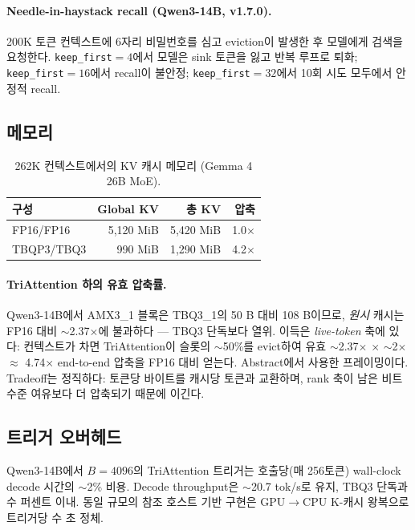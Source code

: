 \documentclass[10pt,twocolumn]{article}
\begin{document}
\paragraph{Needle-in-haystack recall (Qwen3-14B, v1.7.0).}
200K 토큰 컨텍스트에 6자리 비밀번호를 심고 eviction이 발생한 후 모델에게 검색을 요청한다. \texttt{keep\_first}$=4$에서 모델은 sink 토큰을 잃고 반복 루프로 퇴화; \texttt{keep\_first}$=16$에서 recall이 불안정; \texttt{keep\_first}$=32$에서 10회 시도 모두에서 안정적 recall.

\subsection{메모리}

\begin{table}[h]
\centering
\small
\begin{tabular}{@{}lrrr@{}}
\toprule
구성 & Global KV & 총 KV & 압축 \\
\midrule
FP16/FP16 & 5,120 MiB & 5,420 MiB & 1.0$\times$ \\
TBQP3/TBQ3 & 990 MiB & 1,290 MiB & 4.2$\times$ \\
\bottomrule
\end{tabular}
\caption{262K 컨텍스트에서의 KV 캐시 메모리 (Gemma 4 26B MoE).}
\label{tab:memory}
\end{table}

\paragraph{TriAttention 하의 유효 압축률.}
Qwen3-14B에서 AMX3\_1 블록은 TBQ3\_1의 50 B 대비 108 B이므로, \emph{원시} 캐시는 FP16 대비 $\sim$2.37$\times$에 불과하다 --- TBQ3 단독보다 열위. 이득은 \emph{live-token} 축에 있다: 컨텍스트가 차면 TriAttention이 슬롯의 $\sim$50\%를 evict하여 유효 $\sim$2.37$\times$ $\times$ $\sim$2$\times$ $\approx$ 4.74$\times$ end-to-end 압축을 FP16 대비 얻는다. Abstract에서 사용한 프레이밍이다. Tradeoff는 정직하다: 토큰당 바이트를 캐시당 토큰과 교환하며, rank 축이 남은 비트 수준 여유보다 더 압축되기 때문에 이긴다.

\subsection{트리거 오버헤드}

Qwen3-14B에서 $B=4096$의 TriAttention 트리거는 호출당(매 256토큰) wall-clock decode 시간의 $\sim$2\% 비용. Decode throughput은 $\sim$20.7 tok/s로 유지, TBQ3 단독과 수 퍼센트 이내. 동일 규모의 참조 호스트 기반 구현은 GPU$\to$CPU K-캐시 왕복으로 트리거당 수 초 정체.
\end{document}
